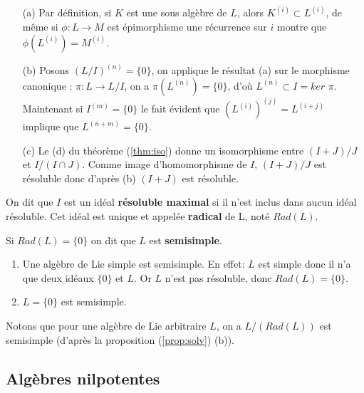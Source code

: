 \documentclass[a4paper,openany,12pt]{report}
\theoremstyle{break}
{\theorembodyfont{\upshape}
\newtheorem*{rmq}{Remarque :}
\newtheorem*{prv}{Preuve :}
\newtheorem*{ex}{Exemples :}
\newtheorem*{exe}{Exemple : }
\newtheorem*{nota}{Notation :}
\newtheorem*{dem}{D\'emonstration :}}
\begin{document}
\begin{prv}
\begin{enumerate}
\item[(a)] Par définition, si $K$ est une sous algèbre de $L$, alors $K^{(i)} \subset L^{(i)}$, de même si $\phi: L \rightarrow M$ est épimorphisme une récurrence sur $i$ montre que $\phi\left(L^{(i)}\right)=M^{(i)}$.

\item[(b)] Posons $(L / I)^{(n)}= \{0\}$, on applique le résultat (a) sur le morphisme canonique : $\pi: L \rightarrow L / I$, on a  $\pi\left(L^{(n)}\right)= \{0\}$, d'où  $L^{(n)} \subset I = ker$ $\pi$. Maintenant si  $I^{(m)}= \{0\}$ le fait évident que $\left(L^{(i)}\right)^{(j)}=L^{(i+j)}$ implique que  $L^{(n+m)}= \{0\}$. 

\item[(c)] Le (d) du théorème (\ref{thm:iso}) donne un isomorphisme entre $(I+J) / J$ et $I /(I \cap J)$. Comme image d'homomorphisme de $I$, $(I+J) / J$  est résoluble donc d'après (b)  $(I+J)$ est résoluble.
\end{enumerate}
\end{prv}

\begin{df}
\quad On dit que $I$ est un idéal \textbf{résoluble maximal} si il n'est inclus dans aucun idéal résoluble. Cet idéal est unique et appelée \textbf{radical} de L, noté $Rad(L)$.
\end{df}

\begin{df}
\quad Si $Rad (L) = \{0\}$ on dit que $L$ est \textbf{semisimple}.
\end{df}

\begin{ex}
\begin{enumerate}
\item Une algèbre de Lie simple est semisimple.
En effet: $L$ est simple donc il n'a que deux idéaux $\{ 0 \}$ et $L$. Or $L$ n'est pas résoluble, donc $Rad (L)= \{0\}$.

\item $L= \{0\}$ est semisimple.
\end{enumerate}
\end{ex}

Notons que pour une algèbre de Lie arbitraire $L$, on a $L/(Rad (L))$ est semisimple (d'après la proposition (\ref{prop:solv}) (b)).

\subsection{Algèbres nilpotentes}
\end{document}
